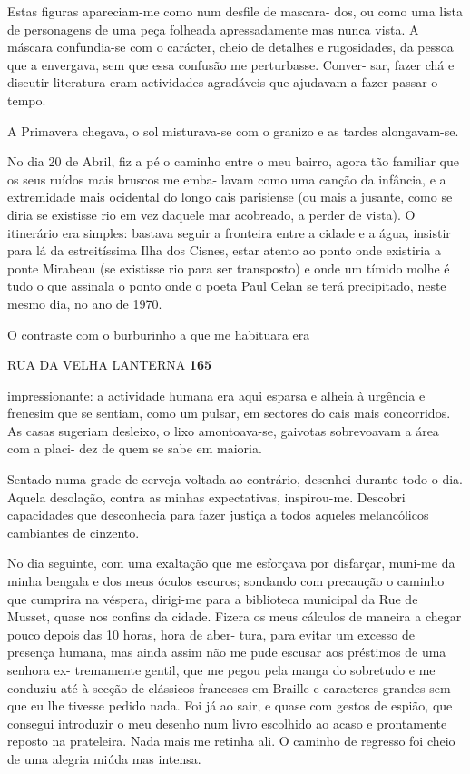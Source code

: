 Estas figuras apareciam-me como num desfile de mascara- dos, ou como uma
lista de personagens de uma peça folheada apressadamente mas nunca
vista. A máscara confundia-se com o carácter, cheio de detalhes e
rugosidades, da pessoa que a envergava, sem que essa confusão me
perturbasse. Conver- sar, fazer chá e discutir literatura eram
actividades agradáveis que ajudavam a fazer passar o tempo.

A Primavera chegava, o sol misturava-se com o granizo e as tardes
alongavam-se.

No dia 20 de Abril, fiz a pé o caminho entre o meu bairro, agora tão
familiar que os seus ruídos mais bruscos me emba- lavam como uma canção
da infância, e a extremidade mais ocidental do longo cais parisiense (ou
mais a jusante, como se diria se existisse rio em vez daquele mar
acobreado, a perder de vista). O itinerário era simples: bastava seguir
a fronteira entre a cidade e a água, insistir para lá da estreitíssima
Ilha dos Cisnes, estar atento ao ponto onde existiria a ponte Mirabeau
(se existisse rio para ser transposto) e onde um tímido molhe é tudo o
que assinala o ponto onde o poeta Paul Celan se terá precipitado, neste
mesmo dia, no ano de 1970.

O contraste com o burburinho a que me habituara era

RUA DA VELHA LANTERNA \textbf{165}

impressionante: a actividade humana era aqui esparsa e alheia à urgência
e frenesim que se sentiam, como um pulsar, em sectores do cais mais
concorridos. As casas sugeriam desleixo, o lixo amontoava-se, gaivotas
sobrevoavam a área com a placi- dez de quem se sabe em maioria.

Sentado numa grade de cerveja voltada ao contrário, desenhei durante
todo o dia. Aquela desolação, contra as minhas expectativas,
inspirou-me. Descobri capacidades que desconhecia para fazer justiça a
todos aqueles melancólicos cambiantes de cinzento.

No dia seguinte, com uma exaltação que me esforçava por disfarçar,
muni-me da minha bengala e dos meus óculos escuros; sondando com
precaução o caminho que cumprira na véspera, dirigi-me para a biblioteca
municipal da Rue de Musset, quase nos confins da cidade. Fizera os meus
cálculos de maneira a chegar pouco depois das 10 horas, hora de aber-
tura, para evitar um excesso de presença humana, mas ainda assim não me
pude escusar aos préstimos de uma senhora ex- tremamente gentil, que me
pegou pela manga do sobretudo e me conduziu até à secção de clássicos
franceses em Braille e caracteres grandes sem que eu lhe tivesse pedido
nada. Foi já ao sair, e quase com gestos de espião, que consegui
introduzir o meu desenho num livro escolhido ao acaso e prontamente
reposto na prateleira. Nada mais me retinha ali. O caminho de regresso
foi cheio de uma alegria miúda mas intensa.

